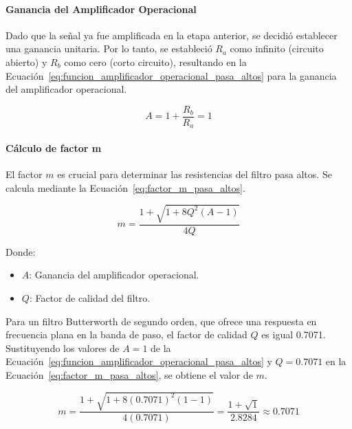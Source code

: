         \paragraph{Ganancia del Amplificador Operacional}
        Dado que la señal ya fue amplificada en la etapa anterior, se decidió establecer una ganancia unitaria. Por lo tanto, se estableció $R_a$ como infinito (circuito abierto) y $R_b$ como cero (corto circuito), resultando en la Ecuación~\ref{eq:funcion_amplificador_operacional_pasa_altos} para la ganancia del amplificador operacional.

        \begin{equation}
            \label{eq:funcion_amplificador_operacional_pasa_altos}
            A = 1 + \frac{R_b}{R_a} = 1
        \end{equation}

        \paragraph{Cálculo de factor m}
        El factor $m$ es crucial para determinar las resistencias del filtro pasa altos. Se calcula mediante la Ecuación~\ref{eq:factor_m_pasa_altos}.

        \begin{equation}
            \label{eq:factor_m_pasa_altos}
            m = \frac{1+\sqrt{1+8Q^2(A-1)}}{4Q}
        \end{equation}

        Donde:
        \begin{itemize}
            \item $A$: Ganancia del amplificador operacional.
            \item $Q$: Factor de calidad del filtro.
        \end{itemize}

        Para un filtro Butterworth de segundo orden, que ofrece una respuesta en frecuencia plana en la banda de paso, el factor de calidad $Q$ es igual 0.7071. Sustituyendo los valores de $A = 1$ de la Ecuación~\ref{eq:funcion_amplificador_operacional_pasa_altos} y $Q = 0.7071$ en la Ecuación~\ref{eq:factor_m_pasa_altos}, se obtiene el valor de $m$.

        \begin{equation}
            \label{eq:factor_m_pasa_altos_valor}
            m = \frac{1+\sqrt{1+8(0.7071)^2(1-1)}}{4(0.7071)} = \frac{1 + \sqrt{1}}{2.8284}\approx 0.7071
        \end{equation}


